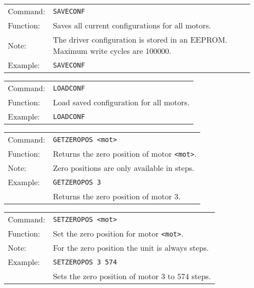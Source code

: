 \begin{table}[!htbp]
  \begin{tabularx}{\textwidth}{lX}
    Command:  & \texttt{SAVECONF}\\
    Function: & Saves all current configurations for all motors.\\
    Note:     & The driver configuration is stored in an EEPROM.
		            Maximum write cycles are 100000.\\
    Example:  & \texttt{SAVECONF}
  \end{tabularx}
\end{table}

\vspace{\vdistace}

\begin{table}[!htbp]
  \begin{tabularx}{\textwidth}{lX}
    Command:  & \texttt{LOADCONF}\\
    Function: & Load saved configuration for all motors.\\
    Example:  & \texttt{LOADCONF}
  \end{tabularx}
\end{table}

\vspace{\vdistace}

\begin{table}[!htbp]
  \begin{tabularx}{\textwidth}{lX}
    Command:  & \texttt{GETZEROPOS <mot>}\\
    Function: & Returns the zero position of motor \texttt{<mot>}.\\
    Note:     & Zero positions are only available in steps.\\
    Example:  & \texttt{GETZEROPOS 3}\\
              & Returns the zero position of motor 3.
  \end{tabularx}
\end{table}

\vspace{\vdistace}

\begin{table}[!htbp]
  \begin{tabularx}{\textwidth}{lX}
    Command:  & \texttt{SETZEROPOS <mot>}\\
    Function: & Set the zero position for motor \texttt{<mot>}.\\
    Note:     & For the zero position the unit is always steps.\\
    Example:  & \texttt{SETZEROPOS 3 574}\\
              & Sets the zero position of motor 3 to 574 steps.
  \end{tabularx}
\end{table}

